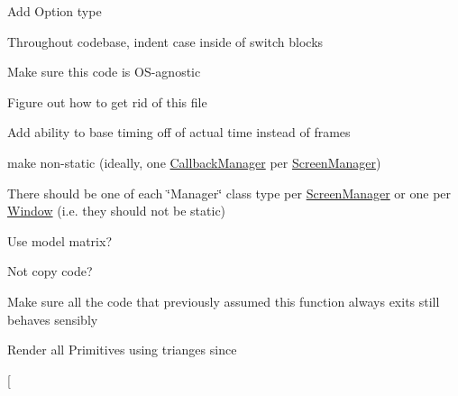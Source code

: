 
\begin{DoxyRefList}
\item[\label{todo__todo000002}%
\Hypertarget{todo__todo000002}%
Namespace \hyperlink{namespacenta}{nta} ]Add Option type 

Throughout codebase, indent {\ttfamily case} inside of {\ttfamily switch} blocks 

Make sure this code is O\+S-\/agnostic 

Figure out how to get rid of this file  
\item[\label{todo__todo000001}%
\Hypertarget{todo__todo000001}%
Class \hyperlink{classnta_1_1CallbackManager}{nta\+:\+:Callback\+Manager} ]Add ability to base timing off of actual time instead of frames 

make non-\/static (ideally, one \hyperlink{classnta_1_1CallbackManager}{Callback\+Manager} per \hyperlink{classnta_1_1ScreenManager}{Screen\+Manager})  
\item[\label{todo__todo000003}%
\Hypertarget{todo__todo000003}%
Class \hyperlink{classnta_1_1ErrorManager}{nta\+:\+:Error\+Manager} ]There should be one of each \char`\"{}\+Manager\char`\"{} class type per \hyperlink{classnta_1_1ScreenManager}{Screen\+Manager} or one per \hyperlink{classnta_1_1Window}{Window} (i.\+e. they should not be static)  
\item[\label{todo__todo000013}%
\Hypertarget{todo__todo000013}%
Member \hyperlink{structnta_1_1Glyph_a3b2afa4370140736d9d1b28de20d2105}{nta\+:\+:Glyph\+:\+:Glyph} (crvec4 pos\+Rect, crvec4 uv\+Rect, G\+Luint tex, float d, crvec4 col, float angle)]Use model matrix?  
\item[\label{todo__todo000016}%
\Hypertarget{todo__todo000016}%
Member \hyperlink{classnta_1_1IOManager_abbfd9da05b22aa488043a19344d38e0a}{nta\+:\+:I\+O\+Manager\+:\+:read\+File\+To\+Buffer} (crstring file\+Path, std\+::string \&buffer)]Not copy code?  
\item[\label{todo__todo000025}%
\Hypertarget{todo__todo000025}%
Member \hyperlink{classnta_1_1Logger_a22e0cfbb0e04de2c377cdd5297c39eee}{nta\+:\+:Logger\+:\+:write\+Error\+To\+Log} (crstring error, Error\+Type type=O\+T\+H\+ER)]Make sure all the code that previously assumed this function always exits still behaves sensibly  
\item[\label{todo__todo000026}%
\Hypertarget{todo__todo000026}%
Member \hyperlink{classnta_1_1PrimitiveBatch_a8b1bcf740a16d65a79566c0a9aebd117}{nta\+:\+:Primitive\+Batch\+:\+:create\+Render\+Batches} ()]Render all Primitives using trianges since  
\item[\label{todo__todo000010}%

\end{DoxyRefList}
